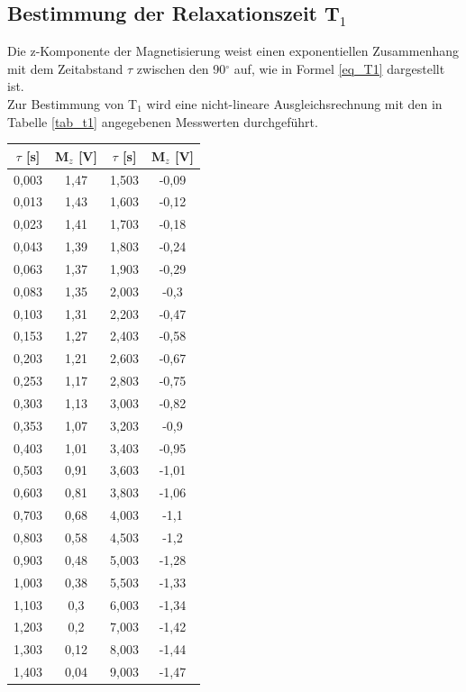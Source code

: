 \documentclass[]{scrartcl}
\begin{document}
\subsection{Bestimmung der Relaxationszeit T$_1$}
Die z-Komponente der Magnetisierung weist einen exponentiellen Zusammenhang mit dem Zeitabstand $\tau$ zwischen den 90$^{\circ}$ auf, wie in Formel \ref{eq_T1} dargestellt ist. \\
Zur Bestimmung von T$_1$ wird eine nicht-lineare Ausgleichsrechnung mit den in Tabelle \ref{tab_t1} angegebenen Messwerten durchgeführt. \\
\begin{center}
	\begin{tabular}{|c|c||c|c|}
		\hline	$\tau$ [s]	&	M$_z$ [V] & $\tau$ [s]	&	M$_z$ [V]\\
		\hline	0,003	&	1,47	&	1,503	&	-0,09	\\
		\hline	0,013	&	1,43	&	1,603	&	-0,12	\\
		\hline	0,023	&	1,41	&	1,703	&	-0,18	\\
		\hline	0,043	&	1,39	&	1,803	&	-0,24	\\
		\hline	0,063	&	1,37	&	1,903	&	-0,29	\\
		\hline	0,083	&	1,35	&	2,003	&	-0,3	\\
		\hline	0,103	&	1,31	&	2,203	&	-0,47	\\
		\hline	0,153	&	1,27	&	2,403	&	-0,58	\\
		\hline	0,203	&	1,21	&	2,603	&	-0,67	\\
		\hline	0,253	&	1,17	&	2,803	&	-0,75	\\
		\hline	0,303	&	1,13	&	3,003	&	-0,82	\\
		\hline	0,353	&	1,07	&	3,203	&	-0,9	\\
		\hline	0,403	&	1,01	&	3,403	&	-0,95	\\
		\hline	0,503	&	0,91	&	3,603	&	-1,01	\\
		\hline	0,603	&	0,81	&	3,803	&	-1,06	\\
		\hline	0,703	&	0,68	&	4,003	&	-1,1	\\
		\hline	0,803	&	0,58	&	4,503	&	-1,2	\\
		\hline	0,903	&	0,48	&	5,003	&	-1,28	\\
		\hline	1,003	&	0,38	&	5,503	&	-1,33	\\
		\hline	1,103	&	0,3	&	6,003	&	-1,34	\\
		\hline	1,203	&	0,2	&	7,003	&	-1,42	\\
		\hline	1,303	&	0,12	&	8,003	&	-1,44	\\
		\hline	1,403	&	0,04	&	9,003	&	-1,47	\\
		\hline
	\end{tabular}
	\label{tab_t1}
\end{center}
\end{document}
